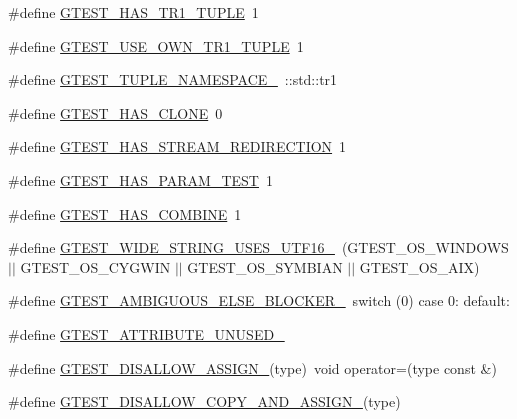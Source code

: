 \begin{DoxyCompactItemize}
\#define \hyperlink{gtest-port_8h_a6de49dd4cbae1db15dc6edca3b179d1b}{G\+T\+E\+S\+T\+\_\+\+H\+A\+S\+\_\+\+T\+R1\+\_\+\+T\+U\+P\+LE}~1
\item 
\#define \hyperlink{gtest-port_8h_afa144e5f5d039db0df873e7ad48c1fda}{G\+T\+E\+S\+T\+\_\+\+U\+S\+E\+\_\+\+O\+W\+N\+\_\+\+T\+R1\+\_\+\+T\+U\+P\+LE}~1
\item 
\#define \hyperlink{gtest-port_8h_a2023f59bfbd8fb7148262a63bdbf0b01}{G\+T\+E\+S\+T\+\_\+\+T\+U\+P\+L\+E\+\_\+\+N\+A\+M\+E\+S\+P\+A\+C\+E\+\_\+}~\+::std\+::tr1
\item 
\#define \hyperlink{gtest-port_8h_a40c075a7f969a694e59532356be59fd5}{G\+T\+E\+S\+T\+\_\+\+H\+A\+S\+\_\+\+C\+L\+O\+NE}~0
\item 
\#define \hyperlink{gtest-port_8h_add695166eb7b691f93777525d5881062}{G\+T\+E\+S\+T\+\_\+\+H\+A\+S\+\_\+\+S\+T\+R\+E\+A\+M\+\_\+\+R\+E\+D\+I\+R\+E\+C\+T\+I\+ON}~1
\item 
\#define \hyperlink{gtest-port_8h_a743ee591e0b9a044e3d7513ad5ab5ef9}{G\+T\+E\+S\+T\+\_\+\+H\+A\+S\+\_\+\+P\+A\+R\+A\+M\+\_\+\+T\+E\+ST}~1
\item 
\#define \hyperlink{gtest-port_8h_a91a068d3bf6855b6f399f01836ae1482}{G\+T\+E\+S\+T\+\_\+\+H\+A\+S\+\_\+\+C\+O\+M\+B\+I\+NE}~1
\item 
\#define \hyperlink{gtest-port_8h_a0e3904ca8d62334ab5f29c057dceb6a1}{G\+T\+E\+S\+T\+\_\+\+W\+I\+D\+E\+\_\+\+S\+T\+R\+I\+N\+G\+\_\+\+U\+S\+E\+S\+\_\+\+U\+T\+F16\+\_\+}~(G\+T\+E\+S\+T\+\_\+\+O\+S\+\_\+\+W\+I\+N\+D\+O\+WS $\vert$$\vert$ G\+T\+E\+S\+T\+\_\+\+O\+S\+\_\+\+C\+Y\+G\+W\+IN $\vert$$\vert$ G\+T\+E\+S\+T\+\_\+\+O\+S\+\_\+\+S\+Y\+M\+B\+I\+AN $\vert$$\vert$ G\+T\+E\+S\+T\+\_\+\+O\+S\+\_\+\+A\+IX)
\item 
\#define \hyperlink{gtest-port_8h_a00b3684a621ce1422b55a0e7e8a6aecb}{G\+T\+E\+S\+T\+\_\+\+A\+M\+B\+I\+G\+U\+O\+U\+S\+\_\+\+E\+L\+S\+E\+\_\+\+B\+L\+O\+C\+K\+E\+R\+\_\+}~switch (0) case 0\+: default\+:
\item 
\#define \hyperlink{gtest-port_8h_a01f3b31960fc7c4c7ee4b398a914f89a}{G\+T\+E\+S\+T\+\_\+\+A\+T\+T\+R\+I\+B\+U\+T\+E\+\_\+\+U\+N\+U\+S\+E\+D\+\_\+}
\item 
\#define \hyperlink{gtest-port_8h_ac593b50ce24257d5b6aa84845c344c9e}{G\+T\+E\+S\+T\+\_\+\+D\+I\+S\+A\+L\+L\+O\+W\+\_\+\+A\+S\+S\+I\+G\+N\+\_\+}(type)~void operator=(type const \&)
\item 
\#define \hyperlink{gtest-port_8h_aed8c1888c32b588b0681e88b95031e29}{G\+T\+E\+S\+T\+\_\+\+D\+I\+S\+A\+L\+L\+O\+W\+\_\+\+C\+O\+P\+Y\+\_\+\+A\+N\+D\+\_\+\+A\+S\+S\+I\+G\+N\+\_\+}(type)
$$
\end{DoxyCompactItemize}
